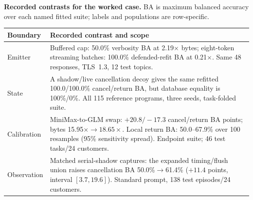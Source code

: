 \par\medskip\noindent\begin{minipage}{\columnwidth}\centering\footnotesize
\textbf{Recorded contrasts for the worked case.} BA is maximum balanced accuracy over each named fitted suite; labels and populations are row-specific.\par\smallskip
\begin{tabularx}{\columnwidth}{@{}p{}Y@{}}\toprule
Boundary & Recorded contrast and scope\\\midrule
Emitter & Buffered cap: 50.0\% verbosity BA at 2.19$\times$ bytes; eight-token streaming batches: 100.0\% defended-refit BA at 0.21$\times$. Same 48 responses, TLS~1.3, 12 test topics.\\
State & A shadow/live cancellation decoy gives the same refitted 100.0/100.0\% cancel/return BA, but database equality is 100\%/0\%. All 115 reference programs, three seeds, task-folded suite.\\
Calibration & MiniMax-to-GLM swap: $+20.8/-17.3$ cancel/return BA points; bytes 15.95$\times\to18.65\times$. Local return BA: 50.0--67.9\% over 100 resamples (95\% sensitivity spread). Endpoint suite; 46 test tasks/24 customers.\\
Observation & Matched serial-shadow captures: the expanded timing/flush union raises cancellation BA 50.0\%$\to$61.4\% ($+11.4$ points, interval $[3.7,19.6]$). Standard prompt, 138 test episodes/24 customers.\\\bottomrule
\end{tabularx}
\end{minipage}\par\medskip
